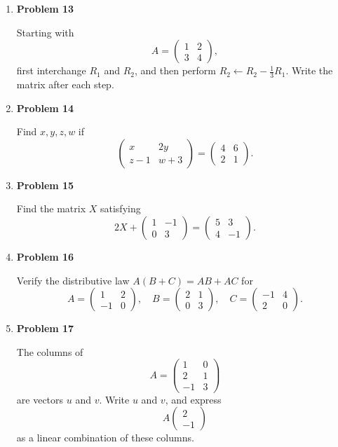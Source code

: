 \begin{enumerate}
\item \textbf{Problem 13}\par
Starting with
\[
A=\begin{pmatrix}
1&2\\
3&4
\end{pmatrix},
\]
first interchange \(R_1\) and \(R_2\), and then perform \(R_2\leftarrow R_2-\frac13R_1\). Write the matrix after each step.

\item \textbf{Problem 14}\par
Find \(x,y,z,w\) if
\[
\begin{pmatrix}
x&2y\\
z-1&w+3
\end{pmatrix}
=
\begin{pmatrix}
4&6\\
2&1
\end{pmatrix}.
\]

\item \textbf{Problem 15}\par
Find the matrix \(X\) satisfying
\[
2X+\begin{pmatrix}1&-1\\0&3\end{pmatrix}
=
\begin{pmatrix}5&3\\4&-1\end{pmatrix}.
\]

\item \textbf{Problem 16}\par
Verify the distributive law \(A(B+C)=AB+AC\) for
\[
A=\begin{pmatrix}1&2\\-1&0\end{pmatrix},
\quad
B=\begin{pmatrix}2&1\\0&3\end{pmatrix},
\quad
C=\begin{pmatrix}-1&4\\2&0\end{pmatrix}.
\]

\item \textbf{Problem 17}\par
The columns of
\[
A=\begin{pmatrix}
1&0\\
2&1\\
-1&3
\end{pmatrix}
\]
are vectors \(u\) and \(v\). Write \(u\) and \(v\), and express
\[
A\begin{pmatrix}2\\-1\end{pmatrix}
\]
as a linear combination of these columns.


\end{enumerate}

